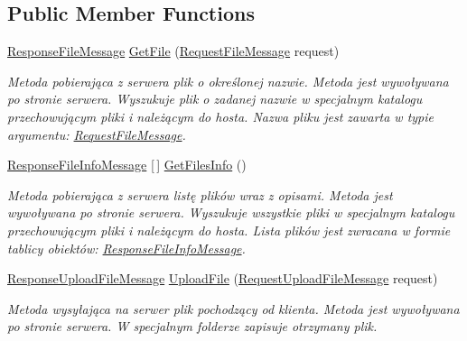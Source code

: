 \subsection*{Public Member Functions}
\begin{DoxyCompactItemize}
\item 
\hyperlink{class_wcf_stream_service_contract_1_1_response_file_message}{Response\+File\+Message} \hyperlink{class_wcf_stream_service_contract_1_1_moj_strumien_af4959737574f4dca1230d168dc5846e8}{Get\+File} (\hyperlink{class_wcf_stream_service_contract_1_1_request_file_message}{Request\+File\+Message} request)
\begin{DoxyCompactList}\small\item\em Metoda pobierająca z serwera plik o określonej nazwie. Metoda jest wywoływana po stronie serwera. Wyszukuje plik o zadanej nazwie w specjalnym katalogu przechowującym pliki i należącym do hosta. Nazwa pliku jest zawarta w typie argumentu\+: \hyperlink{class_wcf_stream_service_contract_1_1_request_file_message}{Request\+File\+Message}. \end{DoxyCompactList}\item 
\hyperlink{class_wcf_stream_service_contract_1_1_response_file_info_message}{Response\+File\+Info\+Message} \mbox{[}$\,$\mbox{]} \hyperlink{class_wcf_stream_service_contract_1_1_moj_strumien_a48ae5c4785e9603cfcf2aa75e2ecd189}{Get\+Files\+Info} ()
\begin{DoxyCompactList}\small\item\em Metoda pobierająca z serwera listę plików wraz z opisami. Metoda jest wywoływana po stronie serwera. Wyszukuje wszystkie pliki w specjalnym katalogu przechowującym pliki i należącym do hosta. Lista plików jest zwracana w formie tablicy obiektów\+: \hyperlink{class_wcf_stream_service_contract_1_1_response_file_info_message}{Response\+File\+Info\+Message}. \end{DoxyCompactList}\item 
\hyperlink{class_wcf_stream_service_contract_1_1_response_upload_file_message}{Response\+Upload\+File\+Message} \hyperlink{class_wcf_stream_service_contract_1_1_moj_strumien_a436badd7f8eba36f5f6aae8466ae7416}{Upload\+File} (\hyperlink{class_wcf_stream_service_contract_1_1_request_upload_file_message}{Request\+Upload\+File\+Message} request)
\begin{DoxyCompactList}\small\item\em Metoda wysyłająca na serwer plik pochodzący od klienta. Metoda jest wywoływana po stronie serwera. W specjalnym folderze zapisuje otrzymany plik. \end{DoxyCompactList}\end{DoxyCompactItemize}

